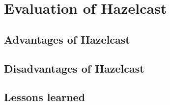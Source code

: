 
\section{Evaluation of Hazelcast}
\todo{}
\subsection{Advantages of Hazelcast}
\todo{}
\subsection{Disadvantages of Hazelcast}
\todo{}
\subsection{Lessons learned}
\todo{}
